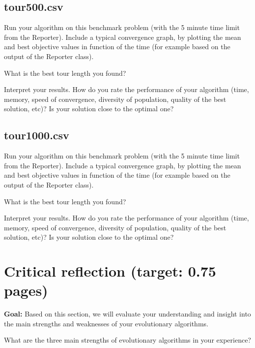 \documentclass[a4paper,10pt]{article}
\newcommand{\ReplaceMe}[1]{{\color{blue}#1}}
\newcommand{\RemoveMe}[1]{{\color{purple}#1}}
\begin{document}
\subsection{tour500.csv}

\ReplaceMe{Run your algorithm on this benchmark problem (with the 5 minute time limit from the Reporter). Include a typical convergence graph, by plotting the mean and best objective values in function of the time (for example based on the output of the Reporter class). 

What is the best tour length you found? 

Interpret your results. How do you rate the performance of your algorithm (time, memory, speed of convergence, diversity of population, quality of the best solution, etc)? Is your solution close to the optimal one?}

\subsection{tour1000.csv}

\ReplaceMe{Run your algorithm on this benchmark problem (with the 5 minute time limit from the Reporter). Include a typical convergence graph, by plotting the mean and best objective values in function of the time (for example based on the output of the Reporter class). 

What is the best tour length you found? 

Interpret your results. How do you rate the performance of your algorithm (time, memory, speed of convergence, diversity of population, quality of the best solution, etc)? Is your solution close to the optimal one? }


\section{Critical reflection (target: 0.75 pages)}

\RemoveMe{\textbf{Goal:} Based on this section, we will evaluate your understanding and insight into the main strengths and weaknesses of your evolutionary algorithms.}

\ReplaceMe{What are the three main strengths of evolutionary algorithms in your experience?}
\end{document}
